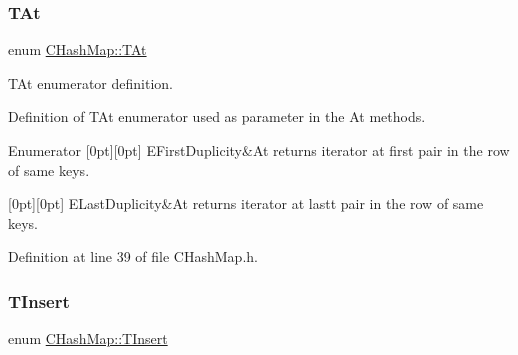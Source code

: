 \subsubsection{\texorpdfstring{T\+At}{TAt}}
{\footnotesize\ttfamily enum \hyperlink{class_c_hash_map_a9c8b9ae56d510ae0ff5e9ba74ee9930d}{C\+Hash\+Map\+::\+T\+At}\hspace{0.3cm}{\ttfamily [strong]}}



T\+At enumerator definition. 

Definition of T\+At enumerator used as parameter in the At methods. \begin{DoxyEnumFields}{Enumerator}
[0pt][0pt]{}\mbox{\label{class_c_hash_map_a9c8b9ae56d510ae0ff5e9ba74ee9930da583fa6e6852d051c6e7f4b63cad9991f}} 
E\+First\+Duplicity&At returns iterator at first pair in the row of same keys. \\
\hline

[0pt][0pt]{}\mbox{\label{class_c_hash_map_a9c8b9ae56d510ae0ff5e9ba74ee9930da25f8a9e347bc7a066cf16ab19d17d12b}} 
E\+Last\+Duplicity&At returns iterator at lastt pair in the row of same keys. \\
\hline

\end{DoxyEnumFields}


Definition at line 39 of file C\+Hash\+Map.\+h.

\mbox{\label{class_c_hash_map_ad4dd353df970a4464c449ef9f3b6a172}} 
\subsubsection{\texorpdfstring{T\+Insert}{TInsert}}
{\footnotesize\ttfamily enum \hyperlink{class_c_hash_map_ad4dd353df970a4464c449ef9f3b6a172}{C\+Hash\+Map\+::\+T\+Insert}\hspace{0.3cm}{\ttfamily [strong]}}



